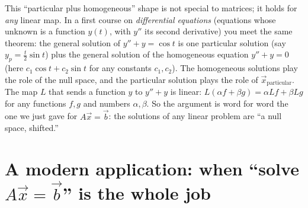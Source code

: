 \begin{connectionbox}
This ``particular plus homogeneous'' shape is not special to matrices; it
holds for \emph{any} linear map. In a first course on
\emph{differential equations} (equations whose unknown is a function
$y(t)$, with $y''$ its second derivative) you meet the same theorem: the
general solution of $y'' + y = \cos t$ is one particular solution (say
$y_p=\tfrac{t}{2}\sin t$) plus the general solution of the homogeneous
equation $y''+y=0$ (here $c_1\cos t + c_2\sin t$ for any constants
$c_1,c_2$). The homogeneous solutions
play the role of the null space, and the particular solution plays the role
of $\vec x_{\text{particular}}$. The map $L$ that sends a function $y$ to
$y''+y$ is linear: $L(\alpha f+\beta g)=\alpha L f+\beta Lg$ for any
functions $f,g$ and numbers $\alpha,\beta$. So the argument is word for word
the one we just gave for $A\vec x=\vec b$: the solutions of any linear
problem are ``a null space, shifted.''
\end{connectionbox}

\section{A modern application: when ``solve $A\vec x=\vec b$'' is the whole job}


